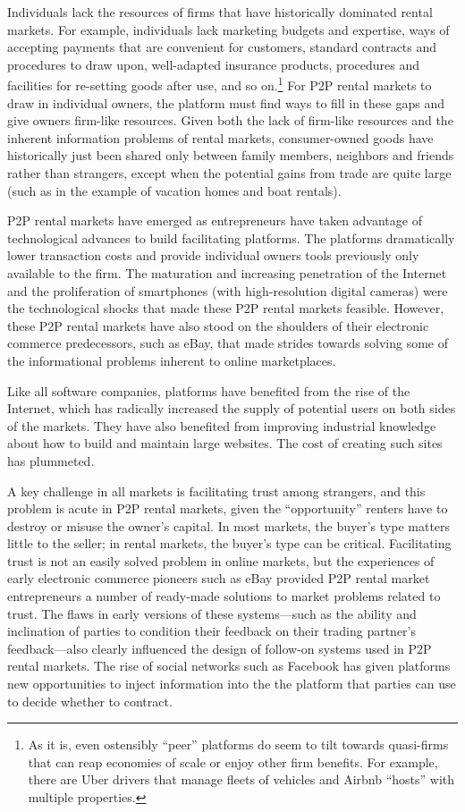 \documentclass[11pt]{article}
\begin{document}
Individuals lack the resources of firms that have historically dominated rental markets. 
For example, individuals lack marketing budgets and expertise, ways of accepting payments that are convenient for customers, standard contracts and procedures to draw upon, well-adapted insurance products, procedures and facilities for re-setting goods after use, and so on.\footnote{
  As it is, even ostensibly ``peer'' platforms do seem to tilt towards quasi-firms that can reap economies of scale or enjoy other firm benefits.
  For example, there are Uber drivers that manage fleets of vehicles and Airbnb ``hosts'' with multiple properties. 
  }
For P2P rental markets to draw in individual owners, the platform must find ways to fill in these gaps and give owners firm-like resources. 
Given both the lack of firm-like resources and the inherent information problems of rental markets, consumer-owned goods have historically just been shared only between family members, neighbors and friends rather than strangers, except when the potential gains from trade are quite large (such as in the example of vacation homes and boat rentals). 

P2P rental markets have emerged as entrepreneurs have taken advantage of technological advances to build facilitating platforms. 
The platforms dramatically lower transaction costs and provide individual owners tools previously only available to the firm. 
The maturation and increasing penetration of the Internet and the proliferation of smartphones (with high-resolution digital cameras) were the technological shocks that made these P2P rental markets feasible. 
However, these P2P rental markets have also stood on the shoulders of their electronic commerce predecessors, such as eBay, that made strides towards solving some of the informational problems inherent to online marketplaces. 

Like all software companies, platforms have benefited from the rise of the Internet, which has radically increased the supply of potential users on both sides of the markets. 
They have also benefited from improving industrial knowledge about how to build and maintain large websites.
The cost of creating such sites has plummeted. 

A key challenge in all markets is facilitating trust among strangers, and this problem is acute in P2P rental markets, given the ``opportunity'' renters have to destroy or misuse the owner's capital.
In most markets, the buyer's type matters little to the seller; in rental markets, the buyer's type can be critical. 
Facilitating trust is not an easily solved problem in online markets, but the experiences of early electronic commerce pioneers such as eBay provided P2P rental market entrepreneurs a number of ready-made solutions to market problems related to trust. 
The flaws in early versions of these systems---such as the ability and inclination of parties to condition their feedback on their trading partner's feedback---also clearly influenced the design of follow-on systems used in P2P rental markets. 
The rise of social networks such as Facebook has given platforms new opportunities to inject information into the the platform that parties can use to decide whether to contract. 
\end{document}

